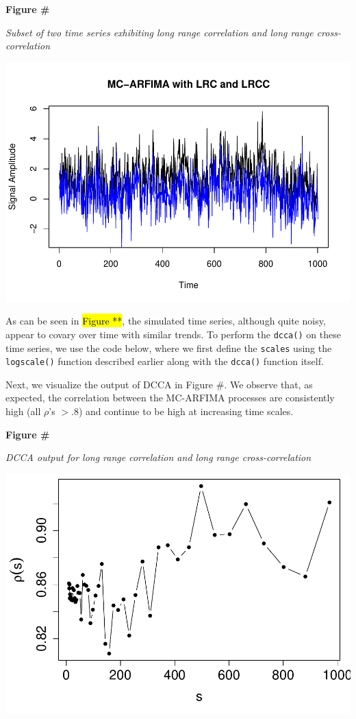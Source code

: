 \documentclass[
  man]{apa6}
\begin{document}
\textbf{Figure \#}

\emph{Subset of two time series exhibiting long range correlation and long
range cross-correlation}

\includegraphics{fractal_regression_paper_brm_files/figure-latex/unnamed-chunk-14-1.pdf}

As can be seen in \hl{Figure **}, the simulated time series, although
quite noisy, appear to covary over time with similar trends. To perform
the \texttt{dcca()} on these time series, we use the code below, where we first
define the \texttt{scales} using the \texttt{logscale()} function described earlier
along with the \texttt{dcca()} function itself.

Next, we visualize the output of DCCA in Figure \#. We observe that, as
expected, the correlation between the MC-ARFIMA processes are
consistently high (all \(\rho\)'s \(> .8\)) and continue to be high at
increasing time scales.

\textbf{Figure \#}

\emph{DCCA output for long range correlation and long range
cross-correlation}

\includegraphics{fractal_regression_paper_brm_files/figure-latex/unnamed-chunk-16-1.pdf}
\end{document}
